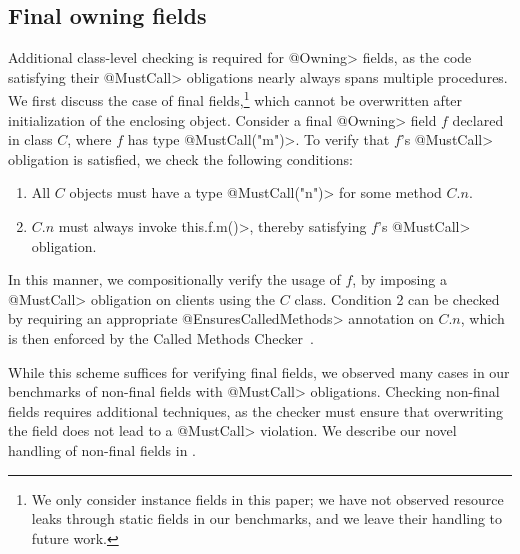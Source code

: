 
\subsection{Final owning fields}
\label{sec:owning-fields}

  Additional class-level checking is required for \<@Owning> fields, as the code
  satisfying their \<@MustCall> obligations nearly always spans multiple
  procedures.  We first discuss the case of final fields,\footnote{We only
  consider instance fields in this paper; we have not observed resource leaks
  through static fields in our benchmarks, and we leave their handling to future
  work.} which cannot be overwritten after initialization of the enclosing
  object.  Consider a final \<@Owning> field $f$ declared in class $C$, where
  $f$ has type \<@MustCall("m")>.  To
  verify that $f$'s \<@MustCall> obligation is satisfied, we check the following
  conditions:
  \begin{enumerate}
    \item All $C$ objects must have a type \<@MustCall("n")> for some method $C.n$.
    \item $C.n$ must always invoke \<this.f.m()>, thereby satisfying $f$'s
    \<@MustCall> obligation.
  \end{enumerate}
  In this manner, we compositionally verify the usage of $f$, by imposing
  a \<@MustCall> obligation on clients using the $C$ class.  Condition 2 can be
  checked by requiring an appropriate \<@EnsuresCalledMethods> annotation on
  $C.n$, which is then enforced by the Called Methods
  Checker~\cite{kellogg20verifying}.  

  While this scheme suffices for verifying final fields, we observed many cases
  in our benchmarks of non-final fields with \<@MustCall> obligations.  Checking
  non-final fields requires additional techniques, as the checker must ensure
  that overwriting the field does not lead to a \<@MustCall> violation.  We
  describe our novel handling of non-final fields in .

